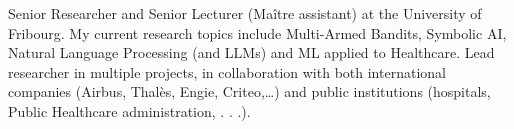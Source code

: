 \documentclass[letter,10pt]{article}
\begin{document}


Senior Researcher and Senior Lecturer (Maître assistant) at the University of Fribourg. My current research topics include Multi-Armed Bandits, Symbolic AI, Natural Language Processing (and LLMs) and ML applied to Healthcare.
Lead researcher in multiple projects, in collaboration with both international companies (Airbus, Thalès, Engie, Criteo,\ldots) and public institutions (hospitals, Public Healthcare administration, . . .). 
\end{document}
